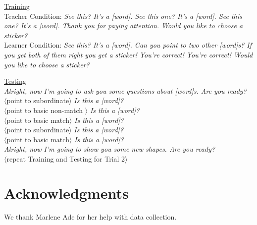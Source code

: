 \documentclass[man]{apa2}
\begin{document}
\noindent \underline{Training} \\
	Teacher Condition: {\it See this? It's a [word]. See this one? It's a [word]. See this one? It's a [word]. Thank you for paying attention. Would you like to choose a sticker? }
\\
Learner Condition: {\it See this? It's a [word]. Can you point to two other [word]s? If you get both of them right you get a sticker! You're correct! You're correct! Would you like to choose a sticker? }
\vspace{2.5mm}
 
\noindent \underline{Testing} \\
{\it Alright, now I'm going to ask you some questions about [word]s. Are you ready?} \\
$\langle$point to subordinate$\rangle$ {\it Is this a [word]?} \\
$\langle$point to basic non-match $\rangle$ {\it Is this a [word]?} \\
$\langle$point to basic match$\rangle$ {\it Is this a [word]?}\\
$\langle$point to subordinate$\rangle$ {\it Is this a [word]?} \\
$\langle$point to basic match$\rangle$ {\it Is this a [word]?} \\
 
{\it Alright, now I'm going to show you some new shapes. Are you ready?}\\

\vspace{2.5mm}
\noindent $\langle$repeat Training and Testing for Trial 2$\rangle$ \\

\nocite{re2013}
\nocite{sanchez2003effect}

\section{Acknowledgments}

We thank Marlene Ade for her help with data collection.





\newpage
\theappendix 
\end{document}
